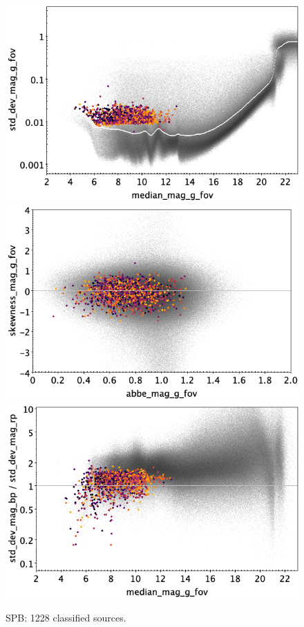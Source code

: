\documentclass[longauth]{aa}
\begin{document}
\begin{appendix}
\begin{figure}
\hspace{2mm}
 \includegraphics[width=0.45\hsize]{figures/appendix/SPB_cls_msd.png} \\ %
\vspace{4mm}
 \includegraphics[width=0.45\hsize]{figures/appendix/SPB_cls_ask.png}  %
\hspace{2mm}
 \includegraphics[width=0.45\hsize]{figures/appendix/SPB_cls_msdr.png}  \\ %
\vspace{4mm}
 \caption{SPB: 1228 classified sources.}  
 \label{fig:app:SPB}
\end{figure}


\end{appendix}
\end{document}
